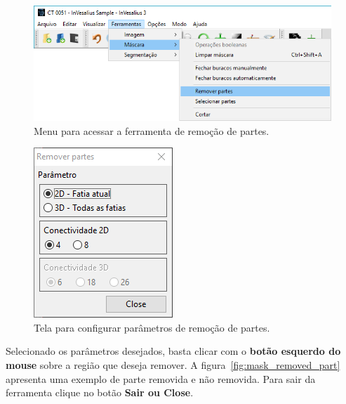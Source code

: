 \begin{figure}[!htb]
\centering
\includegraphics[scale=0.4]{../user_guide_figures/invesalius_screen/menu_mask_remove_part_pt.png}
\caption{Menu para acessar a ferramenta de remoção de partes.}
\label{fig:menu_mask_remove_part}
\end{figure}

\begin{figure}[!htb]
\centering
\includegraphics[scale=0.7]{../user_guide_figures/invesalius_screen/mask_remove_parts_window.png}
\caption{Tela para configurar parâmetros de remoção de partes.}
\label{fig:mask_remove_parts_window}
\end{figure}

Selecionado os parâmetros desejados, basta clicar com o \textbf{botão esquerdo do mouse} sobre a região que deseja remover. A figura~\ref{fig:mask_removed_part} apresenta uma exemplo de parte removida e não removida. Para sair da ferramenta clique no botão \textbf{Sair ou Close}.

